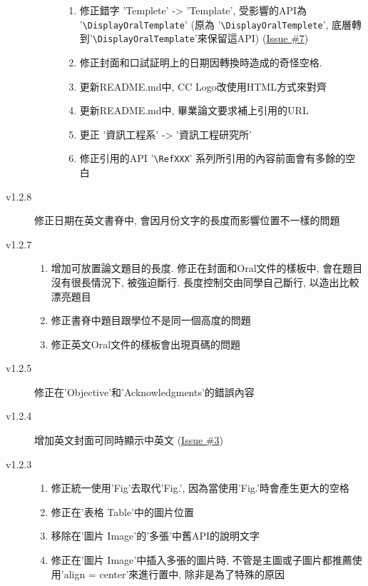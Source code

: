 \begin{description}
\begin{description}
\begin{enumerate}
          \item 修正錯字 'Templete' -> 'Template', 受影響的API為 '\verb|\DisplayOralTemplate|' (原為 '\verb|\DisplayOralTemplete|', 底層轉到'\verb|\DisplayOralTemplate|'來保留這API) (\href{https://github.com/wengan-li/ncku-thesis-template-latex/issues/7}{Issue \#7})
          \item 修正封面和口試証明上的日期因轉換時造成的奇怪空格.
          \item 更新README.md中, CC Logo改使用HTML方式來對齊
          \item 更新README.md中, 畢業論文要求補上引用的URL
          \item 更正 '資訊工程系' -> '資訊工程研究所'
          \item 修正引用的API '\verb|\RefXXX|' 系列所引用的內容前面會有多餘的空白
        \end{enumerate}
    \end{description}

  \item[v1.2.8] 修正日期在英文書脊中, 會因月份文字的長度而影響位置不一樣的問題

  \item[v1.2.7] \hfill
    \begin{enumerate}
      \item 增加可放置論文題目的長度. 修正在封面和Oral文件的樣板中, 會在題目沒有很長情況下, 被強迫斷行. 長度控制交由同學自己斷行, 以造出比較漂亮題目
      \item 修正書脊中題目跟學位不是同一個高度的問題
      \item 修正英文Oral文件的樣板會出現頁碼的問題
    \end{enumerate}

  \item[v1.2.5] 修正在'Objective'和'Acknowledgments'的錯誤內容

  \item[v1.2.4] 增加英文封面可同時顯示中英文 (\href{https://github.com/wengan-li/ncku-thesis-template-latex/issues/3}{Issue \#3})

  \item[v1.2.3] \hfill
    \begin{enumerate}
      \item 修正統一使用'Fig'去取代'Fig.', 因為當使用'Fig.'時會產生更大的空格
      \item 修正在'表格 Table'中的圖片位置
      \item 移除在'圖片 Image'的'多張'中舊API的說明文字
      \item 修正在'圖片 Image'中插入多張的圖片時, 不管是主圖或子圖片都推薦使用'align = center'來進行置中, 除非是為了特殊的原因
    \end{enumerate}


\end{description}
